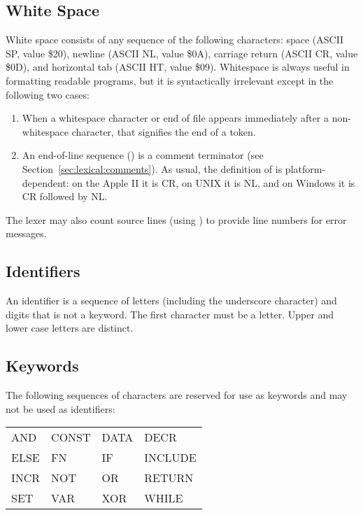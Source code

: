 \documentclass[10pt]{article}
\begin{document}
\subsection{White Space}
\label{sec:lexical:white-space}

White space consists of any sequence of the following characters:
space (ASCII SP, value \$20), newline (ASCII NL, value \$0A), carriage
return (ASCII CR, value \$0D), and horizontal tab (ASCII HT, value
\$09).  Whitespace is always useful in formatting readable programs,
but it is syntactically irrelevant except in the following two cases:
%
\begin{enumerate}
%
\item {} When a whitespace character or end of
file appears immediately after a non-whitespace character, that
signifies the end of a token.
%
\item {} An end-of-line sequence () is a
  comment terminator (see Section~\ref{sec:lexical:comments}).  As
  usual, the definition of  is platform-dependent: on the
  Apple II it is CR, on UNIX it is NL, and on Windows it is CR
  followed by NL.
%
\end{enumerate}
%
The lexer may also count source lines (using ) to provide
line numbers for error messages.

\subsection{Identifiers}\label{Identifiers}

An identifier is a sequence of letters (including the underscore
character) and digits that is not a keyword.  The first character must
be a letter.  Upper and lower case letters are distinct.

\subsection{Keywords}

The following sequences of characters are reserved for use as keywords
and may not be used as identifiers:
\begin{ttfamily}
\begin{center}
\begin{tabular}{l l l l}
AND & CONST & DATA & DECR \\
%
ELSE & FN & IF & INCLUDE \\
%
INCR & NOT & OR & RETURN \\
%
SET & VAR & XOR & WHILE \\
\end{tabular}
\end{center}
\end{ttfamily}
\end{document}

